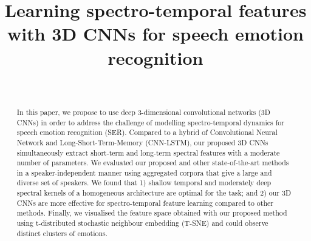 \documentclass[conference, compsoc, twoside]{IEEEtran}
\begin{document}
\title{Learning spectro-temporal features \\with 3D CNNs for speech emotion recognition}

\author{\\

}

\maketitle
\thispagestyle{fancy}
\begin{abstract}
In this paper, we propose to use deep 3-dimensional convolutional networks (3D CNNs) in order to address the challenge of modelling spectro-temporal dynamics for speech emotion recognition (SER). Compared to a hybrid of Convolutional Neural Network and Long-Short-Term-Memory (CNN-LSTM), our proposed 3D CNNs simultaneously extract short-term and long-term spectral features with a moderate number of parameters. We evaluated our proposed and other state-of-the-art methods in a speaker-independent manner using aggregated corpora that give a large and diverse set of speakers. We found that 1) shallow temporal and moderately deep spectral kernels of a homogeneous architecture are optimal for the task; and 2) our 3D CNNs are more effective for spectro-temporal feature learning compared to other methods. Finally, we visualised the feature space obtained with our proposed method using t-distributed stochastic neighbour embedding (T-SNE) and could observe distinct clusters of emotions.
\end{abstract}





%
\IEEEpeerreviewmaketitle
\end{document}

